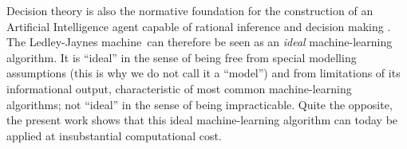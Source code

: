 \documentclass[utf8]{FrontiersinHarvard} %
\newcommand*{\sect}{\S}%
\newcommand*{\chaps}{chs}%
\renewcommand*{\|}[1][]{\nonscript\:#1\vert\nonscript\:\mathopen{}}
\newcommand*{\ljm}{Ledley-Jaynes machine}
\begin{document}
Decision theory is also the normative foundation for the construction of an Artificial Intelligence agent capable of rational inference and decision making \citetext{\citealt[part~IV]{russelletal1995_r2022}; \citealt[\chaps~1--2, 13--14]{jaynes1994_r2003}}. The \ljm\ can therefore be seen as an \emph{ideal} machine-learning algorithm. It is \enquote{ideal} in the sense of being free from special modelling assumptions (this is why we do not call it a \enquote{model}) and from limitations of its informational output, characteristic of most common machine-learning algorithms; not \enquote{ideal} in the sense of being impracticable. Quite the opposite, the present work shows that this ideal machine-learning algorithm can today be applied at insubstantial computational cost. %
\end{document}
